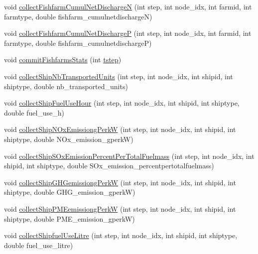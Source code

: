 \begin{DoxyCompactItemize}
\item 
void \mbox{\hyperlink{class_displace_model_a8af39557528b88d674ff582627e4660e}{collect\+Fishfarm\+Cumul\+Net\+DischargeN}} (int step, int node\+\_\+idx, int farmid, int farmtype, double fishfarm\+\_\+cumulnetdischargeN)
\item 
void \mbox{\hyperlink{class_displace_model_aea4bedfd8601081328ee816e30df8ee1}{collect\+Fishfarm\+Cumul\+Net\+DischargeP}} (int step, int node\+\_\+idx, int farmid, int farmtype, double fishfarm\+\_\+cumulnetdischargeP)
\item 
void \mbox{\hyperlink{class_displace_model_a88062dbcbdd8d76aef623cda9cf3d2fe}{commit\+Fishfarms\+Stats}} (int \mbox{\hyperlink{thread__vessels_8cpp_a84bc73d278de929ec9974e1a95d9b23a}{tstep}})
\item 
void \mbox{\hyperlink{class_displace_model_a45f39a3bef5550b551090b0247f953d4}{collect\+Ship\+Nb\+Transported\+Units}} (int step, int node\+\_\+idx, int shipid, int shiptype, double nb\+\_\+transported\+\_\+units)
\item 
void \mbox{\hyperlink{class_displace_model_ac0edef93a3760b4fb90093b4ef88ba1c}{collect\+Ship\+Fuel\+Use\+Hour}} (int step, int node\+\_\+idx, int shipid, int shiptype, double fuel\+\_\+use\+\_\+h)
\item 
void \mbox{\hyperlink{class_displace_model_a81b73d77f0d88bb8a059d601fb3725d4}{collect\+Ship\+N\+Ox\+Emissiong\+PerkW}} (int step, int node\+\_\+idx, int shipid, int shiptype, double N\+Ox\+\_\+emission\+\_\+gperkW)
\item 
void \mbox{\hyperlink{class_displace_model_a6240951029580aacc51e030aa7f85ef4}{collect\+Ship\+S\+Ox\+Emission\+Percent\+Per\+Total\+Fuelmass}} (int step, int node\+\_\+idx, int shipid, int shiptype, double S\+Ox\+\_\+emission\+\_\+percentpertotalfuelmass)
\item 
void \mbox{\hyperlink{class_displace_model_a366db1ea6d9cbe63c54b9adf13039dee}{collect\+Ship\+G\+H\+Gemissiong\+PerkW}} (int step, int node\+\_\+idx, int shipid, int shiptype, double G\+H\+G\+\_\+emission\+\_\+gperkW)
\item 
void \mbox{\hyperlink{class_displace_model_a84a42de30b8f94587c19cf4addb43e55}{collect\+Ship\+P\+M\+Eemissiong\+PerkW}} (int step, int node\+\_\+idx, int shipid, int shiptype, double P\+M\+E\+\_\+emission\+\_\+gperkW)
\item 
void \mbox{\hyperlink{class_displace_model_aaaeacbd3c874a4a93c6cec71ea1db8d3}{collect\+Shipfuel\+Use\+Litre}} (int step, int node\+\_\+idx, int shipid, int shiptype, double fuel\+\_\+use\+\_\+litre)

\end{DoxyCompactItemize}

